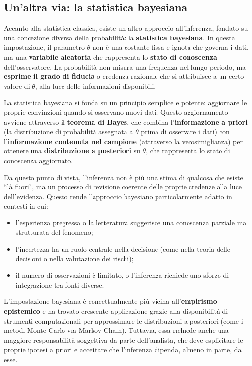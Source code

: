 \documentclass[
  11pt,
]{book}
\providecommand{\tightlist}{%
  \setlength{\itemsep}{0pt}\setlength{\parskip}{0pt}}
\theoremstyle{mytheoremstyle}
\theoremstyle{mydefstyle}
\begin{document}
\subsection{Un'altra via: la statistica bayesiana}\label{unaltra-via-la-statistica-bayesiana}

Accanto alla statistica classica, esiste un altro approccio all'inferenza, fondato su una concezione diversa della probabilità: la \textbf{statistica bayesiana}. In questa impostazione, il parametro \(\theta\) non è una costante fissa e ignota che governa i dati, ma una \textbf{variabile aleatoria} che rappresenta lo \textbf{stato di conoscenza} dell'osservatore. La probabilità non misura una frequenza nel lungo periodo, ma \textbf{esprime il grado di fiducia} o credenza razionale che si attribuisce a un certo valore di \(\theta\), alla luce delle informazioni disponibili.

La statistica bayesiana si fonda su un principio semplice e potente: aggiornare le proprie convinzioni quando si osservano nuovi dati. Questo aggiornamento avviene attraverso il \textbf{teorema di Bayes}, che combina l'\textbf{informazione a priori} (la distribuzione di probabilità assegnata a \(\theta\) prima di osservare i dati) con l'\textbf{informazione contenuta nel campione} (attraverso la verosimiglianza) per ottenere una \textbf{distribuzione a posteriori} su \(\theta\), che rappresenta lo stato di conoscenza aggiornato.

Da questo punto di vista, l'inferenza non è più una stima di qualcosa che esiste ``là fuori'', ma un processo di revisione coerente delle proprie credenze alla luce dell'evidenza. Questo rende l'approccio bayesiano particolarmente adatto in contesti in cui:

\begin{itemize}
\tightlist
\item
  l'esperienza pregressa o la letteratura suggerisce una conoscenza parziale ma strutturata del fenomeno;
\item
  l'incertezza ha un ruolo centrale nella decisione (come nella teoria delle decisioni o nella valutazione dei rischi);
\item
  il numero di osservazioni è limitato, o l'inferenza richiede uno sforzo di integrazione tra fonti diverse.
\end{itemize}

L'impostazione bayesiana è concettualmente più vicina all'\textbf{empirismo epistemico} e ha trovato crescente applicazione grazie alla disponibilità di strumenti computazionali per approssimare le distribuzioni a posteriori (come i metodi Monte Carlo via Markov Chain). Tuttavia, essa richiede anche una maggiore responsabilità soggettiva da parte dell'analista, che deve esplicitare le proprie ipotesi a priori e accettare che l'inferenza dipenda, almeno in parte, da esse.
\end{document}
